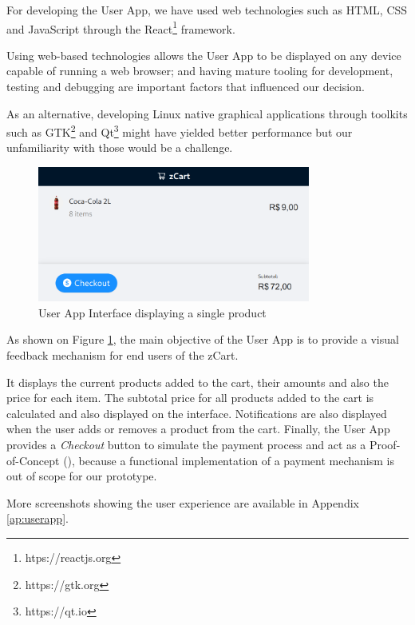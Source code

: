 \documentclass[openright]{normas-utf-tex} %
\begin{document}
For developing the User App, we have used web technologies such 
as HTML, CSS \cite{Duckett2011} and JavaScript \cite{Flanagan2020} through the 
React\footnote{htps://reactjs.org} framework. 

Using web-based technologies allows the User App to be displayed on any 
device capable of running a web browser; and having mature tooling for 
development, testing and debugging are important factors that influenced 
our decision.

As an alternative, developing Linux native graphical applications through
toolkits such as GTK\footnote{https://gtk.org} and Qt\footnote{https://qt.io}
might have yielded better performance but our unfamiliarity with those would be
a challenge.

\begin{figure}[H]
	\centering
	\includegraphics[width=0.8\textwidth]{./images/ui.png}
	\caption[User App Interface display a single product]{User App Interface displaying a single product}
	\label{fig:userapp}
\end{figure}

As shown on Figure \ref{fig:userapp}, the main objective of the User App is to
provide a visual feedback mechanism for end users of the zCart.

It displays the current products added to the cart, their amounts and also the
price for each item. The subtotal price for all products added to the cart is
calculated and also displayed on the interface. Notifications are also
displayed when the user adds or removes a product from the cart. Finally, the
User App provides a \textit{Checkout} button to simulate the payment process
and act as a Proof-of-Concept (), because a functional
implementation of a payment mechanism is out of scope for our prototype.

More screenshots showing the user experience are available in Appendix \ref{ap:userapp}.
\end{document}
